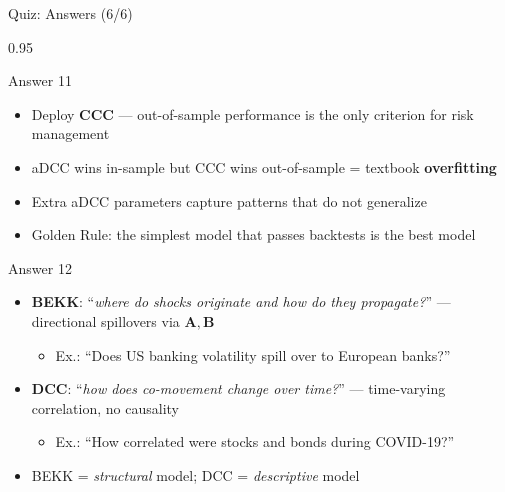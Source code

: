 \documentclass[9pt, aspectratio=169, t]{beamer}
\begin{document}
\begin{frame}{Quiz: Answers (6/6)}
    \begin{cminipage}{0.95\textwidth}
    {\scriptsize
    \begin{exampleblock}{Answer 11}
        \begin{itemize}\setlength{\itemsep}{0pt}
            \item Deploy \textbf{CCC} --- out-of-sample performance is the only criterion for risk management
            \item aDCC wins in-sample but CCC wins out-of-sample = textbook \textbf{overfitting}
            \item Extra aDCC parameters capture patterns that do not generalize
            \item Golden Rule: the simplest model that passes backtests is the best model
        \end{itemize}
    \end{exampleblock}
    \begin{exampleblock}{Answer 12}
        \begin{itemize}\setlength{\itemsep}{0pt}
            \item \textbf{BEKK}: ``\textit{where do shocks originate and how do they propagate?}'' --- directional spillovers via $\mathbf{A}, \mathbf{B}$
                \begin{itemize}\setlength{\itemsep}{0pt}
                    \item Ex.: ``Does US banking volatility spill over to European banks?''
                \end{itemize}
            \item \textbf{DCC}: ``\textit{how does co-movement change over time?}'' --- time-varying correlation, no causality
                \begin{itemize}\setlength{\itemsep}{0pt}
                    \item Ex.: ``How correlated were stocks and bonds during COVID-19?''
                \end{itemize}
            \item BEKK = \textit{structural} model; DCC = \textit{descriptive} model
        \end{itemize}
    \end{exampleblock}
    }
    \end{cminipage}
\end{frame}

\end{document}
